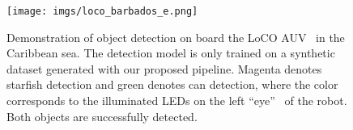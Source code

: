 \begin{figure}[t]
  \centering
  \texttt{[image: imgs/loco\_barbados\_e.png]}
  \caption{Demonstration of object detection on board the LoCO AUV~\cite{loco_paper_2020} in the Caribbean sea. The detection model is only trained on a synthetic dataset generated with our proposed pipeline. Magenta denotes starfish detection and green denotes can detection, where the color corresponds to the illuminated LEDs on the left ``eye''~\cite{fulton2023hreyes} of the robot. Both objects are successfully detected.}
  \label{fig:intro}
\end{figure}